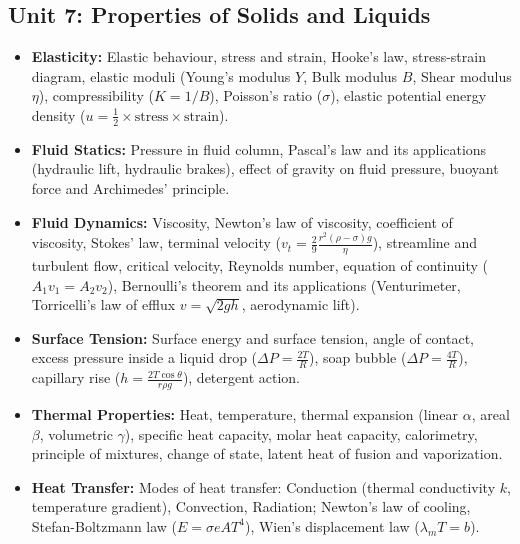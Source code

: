 \documentclass[11pt,a4paper]{article}
\begin{document}
\subsection{Unit 7: Properties of Solids and Liquids}
\begin{itemize}
  \item \textbf{Elasticity:} Elastic behaviour, stress and strain, Hooke's law, stress-strain diagram, elastic moduli (Young's modulus $Y$, Bulk modulus $B$, Shear modulus $\eta$), compressibility ($K = 1/B$), Poisson's ratio ($\sigma$), elastic potential energy density ($u = \frac{1}{2}\times\text{stress}\times\text{strain}$).
  \item \textbf{Fluid Statics:} Pressure in fluid column, Pascal's law and its applications (hydraulic lift, hydraulic brakes), effect of gravity on fluid pressure, buoyant force and Archimedes' principle.
  \item \textbf{Fluid Dynamics:} Viscosity, Newton's law of viscosity, coefficient of viscosity, Stokes' law, terminal velocity ($v_t = \frac{2}{9}\frac{r^2(\rho-\sigma)g}{\eta}$), streamline and turbulent flow, critical velocity, Reynolds number, equation of continuity ($A_1 v_1 = A_2 v_2$), Bernoulli's theorem and its applications (Venturimeter, Torricelli's law of efflux $v=\sqrt{2gh}$, aerodynamic lift).
  \item \textbf{Surface Tension:} Surface energy and surface tension, angle of contact, excess pressure inside a liquid drop ($\Delta P = \frac{2T}{R}$), soap bubble ($\Delta P = \frac{4T}{R}$), capillary rise ($h = \frac{2T\cos\theta}{r\rho g}$), detergent action.
  \item \textbf{Thermal Properties:} Heat, temperature, thermal expansion (linear $\alpha$, areal $\beta$, volumetric $\gamma$), specific heat capacity, molar heat capacity, calorimetry, principle of mixtures, change of state, latent heat of fusion and vaporization.
  \item \textbf{Heat Transfer:} Modes of heat transfer: Conduction (thermal conductivity $k$, temperature gradient), Convection, Radiation; Newton's law of cooling, Stefan-Boltzmann law ($E = \sigma e A T^4$), Wien's displacement law ($\lambda_m T = b$).
\end{itemize}
\end{document}
